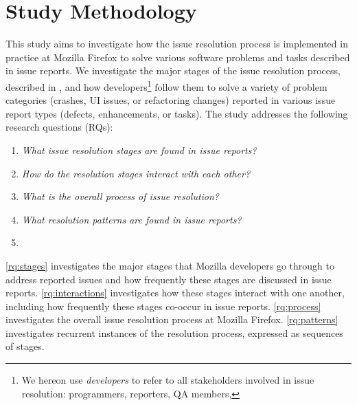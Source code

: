 
\section{Study Methodology}
\label{sec:methodology}

This study aims to investigate how the issue resolution process is implemented in practice at Mozilla Firefox to solve various software problems and tasks described in issue reports.  We investigate the major stages of the issue resolution process, described in , and how developers\footnote{We hereon use \textit{developers} to refer to all stakeholders involved in issue resolution: programmers, reporters, QA members, \etc}  follow them to solve a variety of problem categories (\eg crashes, UI issues, or refactoring changes) reported in various issue report types (defects, enhancements, or tasks). 
The study addresses the following research questions (RQs):

\begin{enumerate}[label=\textbf{RQ$_\arabic*$:}, ref=\textbf{RQ$_\arabic*$}, itemindent=0cm,leftmargin=1cm]
	\item \label{rq:stages}{\textit{What issue resolution stages are found in issue reports?}} 
	\item \label{rq:interactions}{\textit{How do the resolution stages interact with each other?}}
	\item \label{rq:process}{\textit{What is the overall process of issue resolution?}}
	\item \label{rq:patterns}{\textit{What resolution patterns are found in issue reports?}}
	\item \label{rq:pattern_usefulness}{ }
\end{enumerate}

\ref{rq:stages} investigates the major stages that Mozilla developers go through to address reported issues and how frequently these stages are discussed in issue reports. \ref{rq:interactions} investigates how these stages interact with one another, including how frequently these stages co-occur in issue reports. \ref{rq:process} investigates the overall issue resolution process at Mozilla Firefox.  \ref{rq:patterns} investigates recurrent instances of the resolution process, expressed as sequences of stages. 



